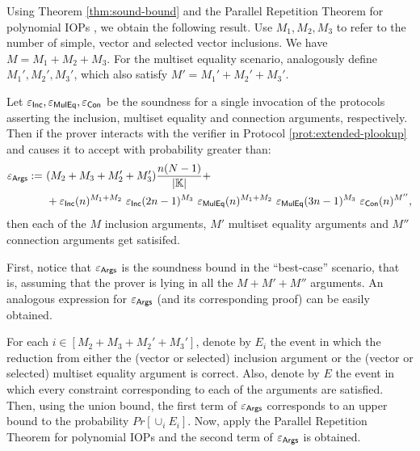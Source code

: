 Using Theorem \ref{thm:sound-bound} and the Parallel Repetition Theorem for polynomial IOPs \cite{EPRINT:BenChiSpo16}, \cite{Goldreich98} we obtain the following result. Use $M_1, M_2, M_3$ to refer to the number of simple, vector and selected vector inclusions. We have $M = M_1+M_2+M_3$. For the multiset equality scenario, analogously define $M_1', M_2', M_3'$, which also satisfy $M' = M_1' + M_2' + M_3'$.
\begin{lemma}
  Let $\varepsilon_{\textsf{Inc}},\varepsilon_{\textsf{MulEq}},\varepsilon_{\textsf{Con}}$ be the soundness for a single invocation of the protocols asserting the inclusion, multiset equality and connection arguments, respectively. Then if the prover interacts with the verifier in Protocol \ref{prot:extended-plookup} and causes it to accept with probability greater than:
  \begin{align*}
  \varepsilon_{\textsf{Args}} := &~(M_2+M_3+M_2'+M_3')\frac{n(N-1)}{|\mathbb{K}|} + \\
  &~+ \varepsilon_{\textsf{Inc}}(n)^{M_1+M_2} ~\varepsilon_{\textsf{Inc}}(2n-1)^{M_3} ~\varepsilon_{\textsf{MulEq}}(n)^{M_1+M_2} ~\varepsilon_{\textsf{MulEq}}(3n-1)^{M_3} ~\varepsilon_{\textsf{Con}}(n)^{M''},
\end{align*}
  then each of the $M$ inclusion arguments, $M'$ multiset equality arguments and $M''$ connection arguments get satisifed.
\end{lemma}
\begin{proofs}
First, notice that $\varepsilon_{\textsf{Args}}$ is the soundness bound in the ``best-case'' scenario, that is, assuming that the prover is lying in all the $M+M'+M''$ arguments. An analogous expression for $\varepsilon_{\textsf{Args}}$ (and its corresponding proof) can be easily obtained. 

For each $i \in [M_2+M_3+M_2'+M_3']$, denote by $E_i$ the event in which the reduction from either the (vector or selected) inclusion argument or the (vector or selected) multiset equality argument is correct. Also, denote by $E$ the event in which every constraint corresponding to each of the arguments are satisfied. Then, using the union bound, the first term of $\varepsilon_{\textsf{Args}}$ corresponds to an upper bound to the probability $Pr[\cup_i E_i]$. Now, apply the Parallel Repetition Theorem for polynomial IOPs and the second term of $\varepsilon_{\textsf{Args}}$ is obtained.
\end{proofs}




